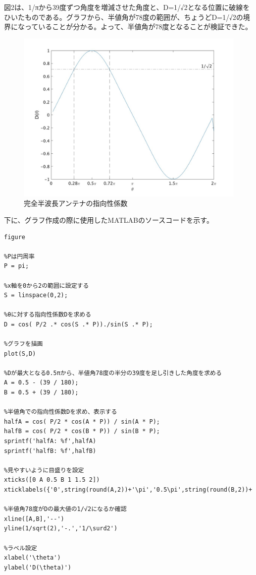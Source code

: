 \documentclass[dvipdfmx,autodetect-engine,titlepage]{jsarticle}
\begin{document}
図2は、1/πから39度ずつ角度を増減させた角度と、D=1/√2となる位置に破線をひいたものである。グラフから、半値角が78度の範囲が、ちょうどD=1/√2の境界になっていることが分かる。よって、半値角が78度となることが検証できた。

\begin{figure}[H]
  \centering
  \includegraphics[scale=0.28]{week8.jpg} 
  \caption{完全半波長アンテナの指向性係数}\label{fig:図2}
\end{figure}

下に、グラフ作成の際に使用したMATLABのソースコードを示す。\\


\begin{lstlisting}[caption=ソースコード,label=1]
  figure

%Pは円周率
P = pi;

%x軸を0から2の範囲に設定する
S = linspace(0,2);

%θに対する指向性係数Dを求める
D = cos( P/2 .* cos(S .* P))./sin(S .* P);

%グラフを描画
plot(S,D)

%Dが最大となる0.5πから、半値角78度の半分の39度を足し引きした角度を求める
A = 0.5 - (39 / 180);
B = 0.5 + (39 / 180);

%半値角での指向性係数Dを求め、表示する
halfA = cos( P/2 * cos(A * P)) / sin(A * P);
halfB = cos( P/2 * cos(B * P)) / sin(B * P);
sprintf('halfA: %f',halfA)
sprintf('halfB: %f',halfB)

%見やすいように目盛りを設定
xticks([0 A 0.5 B 1 1.5 2])
xticklabels({'0',string(round(A,2))+'\pi','0.5\pi',string(round(B,2))+'\pi','\pi','1.5\pi','2\pi'})

%半値角78度がDの最大値の1/√2になるか確認
xline([A,B],'--')
yline(1/sqrt(2),'-.','1/\surd2')

%ラベル設定
xlabel('\theta')
ylabel('D(\theta)')
  
\end{lstlisting}
\end{document}
